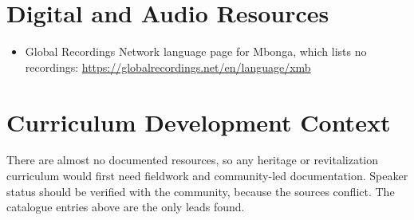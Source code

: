 \documentclass[12pt]{article}
\begin{document}
\section{Digital and Audio Resources}
\begin{itemize}
\item Global Recordings Network language page for Mbonga, which lists no recordings: \url{https://globalrecordings.net/en/language/xmb}
\end{itemize}

\section{Curriculum Development Context}
There are almost no documented resources, so any heritage or revitalization curriculum would first need fieldwork and community-led documentation. Speaker status should be verified with the community, because the sources conflict. The catalogue entries above are the only leads found.
\end{document}
